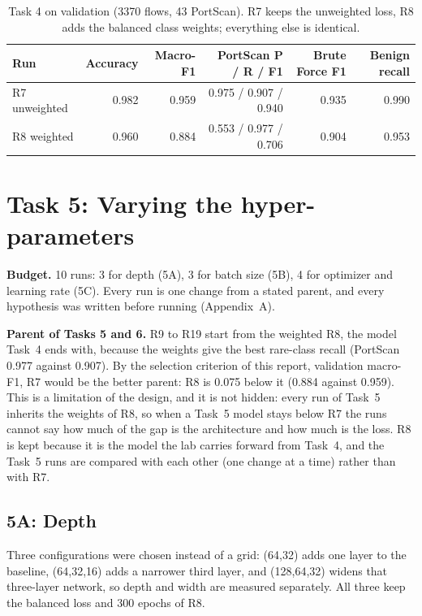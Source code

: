 \documentclass[9pt]{extarticle}
\newcommand{\run}[1]{\textsf{#1}}   %
\begin{document}
\begin{table}[htbp]
\centering\small
\caption{Task 4 on validation (3370 flows, 43 PortScan). \run{R7} keeps the unweighted loss,
\run{R8} adds the balanced class weights; everything else is identical.}
\label{tab:t4}
\begin{tabular}{@{}lrrrrr@{}}
\toprule
Run & Accuracy & Macro-F1 & PortScan P / R / F1 & Brute Force F1 & Benign recall\\
\midrule
\run{R7} unweighted & 0.982 & 0.959 & 0.975 / 0.907 / 0.940 & 0.935 & 0.990\\
\run{R8} weighted   & 0.960 & 0.884 & 0.553 / 0.977 / 0.706 & 0.904 & 0.953\\
\bottomrule
\end{tabular}
\end{table}

\section{Task 5: Varying the hyper-parameters}

\textbf{Budget.} 10 runs: 3 for depth (5A), 3 for batch size (5B), 4 for optimizer and learning
rate (5C). Every run is one change from a stated parent, and every hypothesis was written before
running (Appendix~A).

\textbf{Parent of Tasks 5 and 6.} \run{R9} to \run{R19} start from the weighted \run{R8}, the model
Task~4 ends with, because the weights give the best rare-class recall (PortScan 0.977 against 0.907).
By the selection criterion of this report, validation macro-F1, \run{R7} would be the better parent:
\run{R8} is 0.075 below it (0.884 against 0.959). This is a limitation of the design, and it is not
hidden: every run of Task~5 inherits the weights of \run{R8}, so when a Task~5 model stays below
\run{R7} the runs cannot say how much of the gap is the architecture and how much is the loss. \run{R8}
is kept because it is the model the lab carries forward from Task~4, and the Task~5 runs are compared
with each other (one change at a time) rather than with \run{R7}.

\subsection{5A: Depth}
Three configurations were chosen instead of a grid: (64,32) adds one layer to the baseline,
(64,32,16) adds a narrower third layer, and (128,64,32) widens that three-layer network, so depth
and width are measured separately. All three keep the balanced loss and 300 epochs of \run{R8}.
\end{document}
